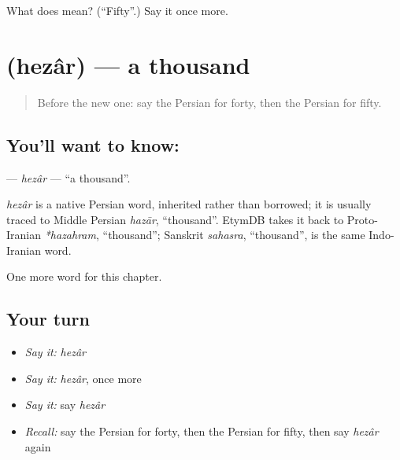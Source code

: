 \begin{tcolorbox}[breakable,colback=teal!4,colframe=teal!35!black,title={Before you move on}]
What does  mean? (\textquotedblleft{}Fifty\textquotedblright{}.) Say it once more.
\end{tcolorbox}
\section[\texorpdfstring{\fa{هزار} (hezâr)}{هزار (hezâr)}]{ (hezâr) — a thousand}

\label{lesson:FA-C77-hezar}



\begin{quote}
Before the new one: say the Persian for forty, then the Persian for fifty.
\end{quote}

\subsection*{You'll want to know: }
\textbf{} — \emph{hezâr} — \textquotedblleft{}a thousand\textquotedblright{}.

\begin{cousinweb}
\emph{hezâr} is a native Persian word, inherited rather than borrowed; it is usually traced to Middle Persian \emph{hazār}, \textquotedblleft{}thousand\textquotedblright{}. EtymDB takes it back to Proto-Iranian \emph{*hazahram}, \textquotedblleft{}thousand\textquotedblright{}; Sanskrit \emph{sahasra}, \textquotedblleft{}thousand\textquotedblright{}, is the same Indo-Iranian word.
\end{cousinweb}

\begin{grammarlens}[title={What you've built}]
One more word for this chapter.
\end{grammarlens}

\subsection*{Your turn}
\begin{itemize}
\raggedright
  \item \emph{Say it:} \emph{hezâr}
  \item \emph{Say it:} \emph{hezâr}, once more
  \item \emph{Say it:} say \emph{hezâr}
  \item \emph{Recall:} say the Persian for forty, then the Persian for fifty, then say \emph{hezâr} again
\end{itemize}

